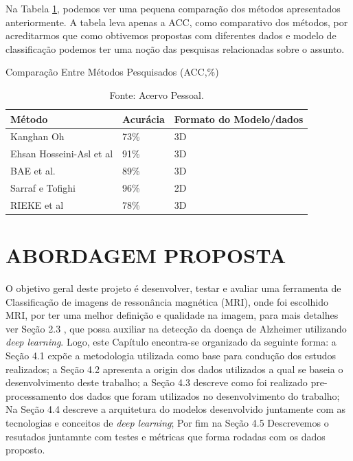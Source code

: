 \documentclass[openright]{UFRGS} %
\begin{document}
Na Tabela \ref{tab:comapreworker}, podemos ver uma pequena comparação dos métodos apresentados anteriormente. A tabela leva apenas a ACC, como comparativo dos métodos, por acreditarmos que como obtivemos propostas com diferentes dados e modelo de classificação podemos ter uma noção das pesquisas
relacionadas  sobre o assunto.


\begin{table}[h]
\centering
\caption{Comparação Entre Métodos Pesquisados  (ACC,\%)}
\label{tab:comapreworker}
\begin{tabular}{|l|l|l|}
\hline
\hspace{1cm} \textbf{Método}               & \textbf{Acurácia} & \textbf{Formato do Modelo/dados} \\ \hline
Kanghan Oh               &      73\%             &  \hspace{2cm}  3D                               \\ \hline
Ehsan Hosseini-Asl et al &    91\%                 &  \hspace{2cm}  3D                               \\ \hline
BAE et al.               &   89\%                 & \hspace{2cm}  3D                                \\ \hline
Sarraf e Tofighi         &    96\%               &    \hspace{2cm}  2D                              \\ \hline
RIEKE et al              &      78\%             &  \hspace{2cm}   3D                              \\ \hline
\end{tabular}
\caption{Fonte: Acervo Pessoal.}
\end{table}







\chapter{ABORDAGEM PROPOSTA}

O objetivo geral deste projeto é desenvolver, testar e avaliar uma ferramenta de Classificação de imagens de ressonância magnética (MRI), onde foi escolhido MRI, por ter uma melhor definição e qualidade na imagem, para mais detalhes ver Seção 2.3
, que possa auxiliar na detecção da doença de Alzheimer utilizando  \textit{deep learning}. Logo,
este Capítulo encontra-se organizado da seguinte forma: a Seção 4.1 expõe a metodologia utilizada como base para condução dos estudos realizados; a Seção 4.2 apresenta a  origin dos dados utilizados
a qual se baseia o desenvolvimento deste trabalho; a Seção 4.3 descreve como
foi realizado pre-processamento dos dados que foram utilizados no desenvolvimento do trabalho; Na
Seção 4.4 descreve a arquitetura do modelos desenvolvido juntamente com as tecnologias e conceitos de \textit{deep learning}; Por fim na
Seção 4.5  Descrevemos o resutados juntamnte com testes e métricas que forma rodadas
com os dados proposto.
\end{document}
